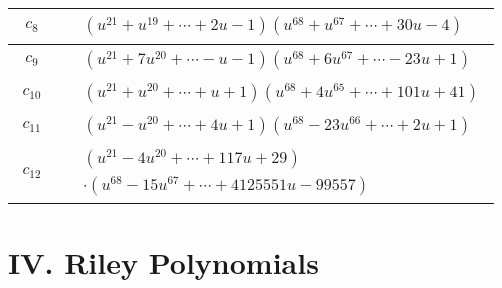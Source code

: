 \documentclass[1p]{elsarticle_modified}
\theoremstyle{definition}
\begin{document}
\begin{tabular}{m{50pt}|m{274pt}}
\hline $$\begin{aligned}c_{8}\end{aligned}$$&$\begin{aligned}
&(u^{21}+u^{19}+\cdots+2 u-1)(u^{68}+u^{67}+\cdots+30 u-4)
\end{aligned}$\\
\hline $$\begin{aligned}c_{9}\end{aligned}$$&$\begin{aligned}
&(u^{21}+7 u^{20}+\cdots- u-1)(u^{68}+6 u^{67}+\cdots-23 u+1)
\end{aligned}$\\
\hline $$\begin{aligned}c_{10}\end{aligned}$$&$\begin{aligned}
&(u^{21}+u^{20}+\cdots+u+1)(u^{68}+4 u^{65}+\cdots+101 u+41)
\end{aligned}$\\
\hline $$\begin{aligned}c_{11}\end{aligned}$$&$\begin{aligned}
&(u^{21}- u^{20}+\cdots+4 u+1)(u^{68}-23 u^{66}+\cdots+2 u+1)
\end{aligned}$\\
\hline $$\begin{aligned}c_{12}\end{aligned}$$&$\begin{aligned}
&(u^{21}-4 u^{20}+\cdots+117 u+29)\\
&\cdot(u^{68}-15 u^{67}+\cdots+4125551 u-99557)
\end{aligned}$\\
\hline
\end{tabular}\newpage\renewcommand{\arraystretch}{1}
\centering \section*{ IV. Riley Polynomials}
\end{document}
